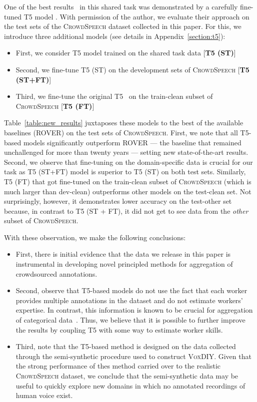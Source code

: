 \documentclass{article}
\newcommand{\speech}{\textsc{CrowdSpeech}}
\newcommand{\vox}{\textsc{VoxDIY}}
\begin{document}
One of the best results~\citep{pletenev21noisy} in this shared task was demonstrated by a carefully fine-tuned  T5 model \citep{JMLR:v21:20-074}. With permission of the author, we evaluate their approach on the test sets of the \speech{} dataset collected in this paper. For this, we introduce three additional models (see details in Appendix~\ref{section:t5}):

\begin{itemize}[itemsep=0pt, leftmargin=15pt, topsep=0pt]
    \item  First, we consider T5 model trained on the shared task data [\textbf{T5 (ST)}]
    \item  Second, we fine-tune T5 (ST) on the development sets of \speech{} [\textbf{T5 (ST+FT)}]
    \item  Third, we fine-tune the original T5~\citep{JMLR:v21:20-074} on the train-clean subset of \speech{} [\textbf{T5 (FT)}]
\end{itemize}

Table~\ref{table:new_results} juxtaposes these models to the best of the available baselines (ROVER) on the test sets of \speech{}. First, we note that all T5-based models significantly outperform ROVER --- the baseline that remained unchallenged for more than twenty years --- setting new state-of-the-art results. Second, we observe that fine-tuning on the domain-specific data is crucial for our task as T5 (ST+FT) model is superior to T5 (ST) on both test sets. Similarly, T5 (FT) that got fine-tuned on the train-clean subset of \speech{} (which is much larger than dev-clean)  outperforms other models on the test-clean set. Not surprisingly, however, it demonstrates lower accuracy on the test-other set because, in contrast to T5 (ST + FT), it did not get to see data from the \emph{other} subset of \speech{}.

With these observation, we make the following conclusions:
\begin{itemize}[itemsep=0pt, leftmargin=15pt, topsep=0pt]
    \item First, there is initial evidence that the data we release in this paper is instrumental in developing novel principled methods for aggregation of crowdsourced annotations. 
    
    \item Second, observe that T5-based models do not use the fact that each worker provides multiple annotations in the dataset and do not estimate workers' expertise. In contrast, this information is known to be crucial for aggregation of categorical data~\citep{Dawid1979MaximumLE,whitehill09count}. Thus, we believe that it is possible to further improve the results by coupling T5 with some way to estimate worker skills.
    
    \item Third, note that the T5-based method is designed on the data collected through the semi-synthetic procedure used to construct \vox{}. Given that the strong performance of thes method carried over to the realistic \speech{} dataset, we conclude that the semi-synthetic data may be useful to quickly explore new domains in which no annotated recordings of human voice exist.
\end{itemize}
\end{document}
